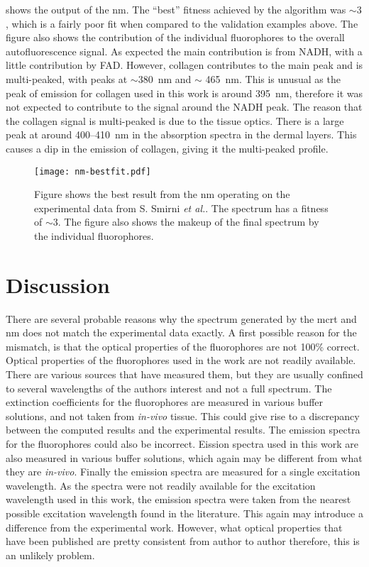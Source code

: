  shows the output of the \gls*{nm}.
The ``best'' fitness achieved by the algorithm was $\sim3$, which is a fairly poor fit when compared to the validation examples above.
The figure also shows the contribution of the individual fluorophores to the overall autofluorescence signal.
As expected the main contribution is from NADH, with a little contribution by FAD\@.
However, collagen contributes to the main peak and is multi-peaked, with peaks at $\sim$380~nm and $\sim$ 465~nm.
This is unusual as the peak of emission for collagen used in this work is around 395~nm, therefore it was not expected to contribute to the signal around the NADH peak.
The reason that the collagen signal is multi-peaked is due to the tissue optics.
There is a large peak at around 400--410~nm in the absorption spectra in the dermal layers.
This causes a dip in the emission of collagen, giving it the multi-peaked profile.

\begin{figure}[!htpb]
  \centering
  \texttt{[image: nm-bestfit.pdf]}
  \caption{Figure shows the best result from the \gls*{nm} operating on the experimental data from S. Smirni \textit{et al.}. The spectrum has a fitness of $\sim 3$. The figure also shows the makeup of the final spectrum by the individual fluorophores.}
  \label{fig:bestNMresult}
\end{figure}

\section{Discussion}

There are several probable reasons why the spectrum generated by the \gls*{mcrt} and \gls*{nm} does not match the experimental data exactly.
A first possible reason for the mismatch, is that the optical properties of the fluorophores are not 100\% correct.
Optical properties of the fluorophores used in the work are not readily available.
There are various sources that have measured them, but they are usually confined to several wavelengths of the authors interest and not a full spectrum.
The extinction coefficients for the fluorophores are measured in various buffer solutions, and not taken from \textit{in-vivo} tissue.
This could give rise to a discrepancy between the computed results and the experimental results.
The emission spectra for the fluorophores could also be incorrect.
Eission spectra used in this work are also measured in various buffer solutions, which again may be different from what they are \textit{in-vivo}.
Finally the emission spectra are measured for a single excitation wavelength.
As the spectra were not readily available for the excitation wavelength used in this work, the emission spectra were taken from the nearest possible excitation wavelength found in the literature. This again may introduce a difference from the experimental work.
However, what optical properties that have been published are pretty consistent from author to author therefore, this is an unlikely problem.

